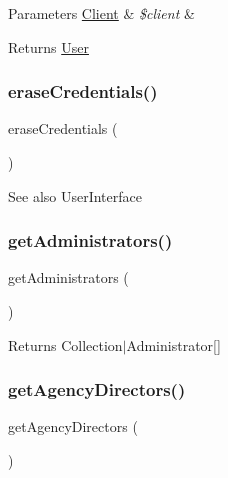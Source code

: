 \begin{DoxyParams}[1]{Parameters}
\mbox{\hyperlink{class_app_1_1_entity_1_1_client}{Client}} & {\em \$client} & \\
\hline
\end{DoxyParams}
\begin{DoxyReturn}{Returns}
\mbox{\hyperlink{class_app_1_1_entity_1_1_user}{User}} 
\end{DoxyReturn}
\mbox{\label{class_app_1_1_entity_1_1_user_ac565b8c00fe93ce673f8237849f072a6}} 
\subsubsection{\texorpdfstring{eraseCredentials()}{eraseCredentials()}}
{\footnotesize\ttfamily erase\+Credentials (\begin{DoxyParamCaption}{ }\end{DoxyParamCaption})}

\begin{DoxySeeAlso}{See also}
User\+Interface 
\end{DoxySeeAlso}
\mbox{\label{class_app_1_1_entity_1_1_user_ae328d7d5e793edba2c422b1be2e729a9}} 
\subsubsection{\texorpdfstring{getAdministrators()}{getAdministrators()}}
{\footnotesize\ttfamily get\+Administrators (\begin{DoxyParamCaption}{ }\end{DoxyParamCaption})}

\begin{DoxyReturn}{Returns}
Collection$\vert$\+Administrator\mbox{[}\mbox{]} 
\end{DoxyReturn}
\mbox{\label{class_app_1_1_entity_1_1_user_ae78734b06690a61802438c55bb0850ef}} 
\subsubsection{\texorpdfstring{getAgencyDirectors()}{getAgencyDirectors()}}
{\footnotesize\ttfamily get\+Agency\+Directors (\begin{DoxyParamCaption}{ }\end{DoxyParamCaption})}


